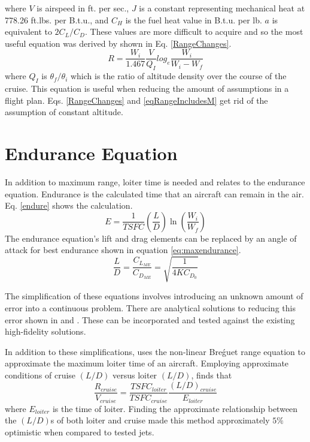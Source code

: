 where $V$ is airspeed in ft. per sec., $J$ is a constant representing mechanical heat at 778.26 ft.lbs. per B.t.u., and $C_H$ is the fuel heat value in B.t.u. per lb. $a$ is equivalent to $2C_L/C_D$. These values are more difficult to acquire and so the most useful equation was derived by \cite{Jonas1947} shown in Eq. \ref{RangeChanges}.
\begin{equation}
    R = \dfrac{W_i}{1.467}\dfrac{V}{Q_I}log_e\dfrac{W_i}{W_i-W_f}
    \label{RangeChanges}
\end{equation}
where $Q_I$ is $\theta_f/\theta_i$ which is the ratio of altitude density over the course of the cruise. This equation is useful when reducing the amount of assumptions in a flight plan. Eqs. \ref{RangeChanges} and \ref{eqRangeIncludesM} get rid of the assumption of constant altitude.\par
\section{Endurance Equation}
In addition to maximum range, loiter time is needed and relates to the endurance equation. Endurance is the calculated time that an aircraft can remain in the air. Eq. \ref{endure} shows the calculation.
\begin{equation}
\label{endure}
E = \dfrac{1}{TSFC}\left(\dfrac{L}{D}\right) \ln\left(\dfrac{W_i}{W_f}\right)
\end{equation}
The endurance equation's lift and drag elements can be replaced by an angle of attack for best endurance \cite{OptimizeBreguet} shown in equation \ref{eq:maxendurance}.
\begin{equation}
\label{eq:maxendurance}
\dfrac{L}{D} = \dfrac{C_{L_{ME}}}{C_{D_{ME}}} = \sqrt{\dfrac{1}{4KC_{D_0}}}
\end{equation}
\par 
The simplification of these equations involves introducing an unknown amount of error into a continuous problem. There are analytical solutions to reducing this error shown in \cite{OptimizeBreguet} and \cite{LoiterTimeFromRange}. These can be incorporated and tested against the existing high-fidelity solutions.\par
In addition to these simplifications, \cite{Raymer} uses the non-linear Bre\'guet range equation to approximate the maximum loiter time of an aircraft. Employing approximate conditions of cruise $(L/D)$ versus loiter $(L/D)$, \cite{Raymer} finds that 
\begin{equation}
    \dfrac{R_{cruise}}{V_{cruise}} = \dfrac{TSFC_{loiter}}{TSFC_{cruise}}\dfrac{(L/D)_{cruise}}{E_{loiter}}
\end{equation}
where $E_{loiter}$ is the time of loiter. Finding the approximate relationship between the $(L/D)$s of both loiter and cruise made this method approximately $5\%$ optimistic when compared to tested jets. 
